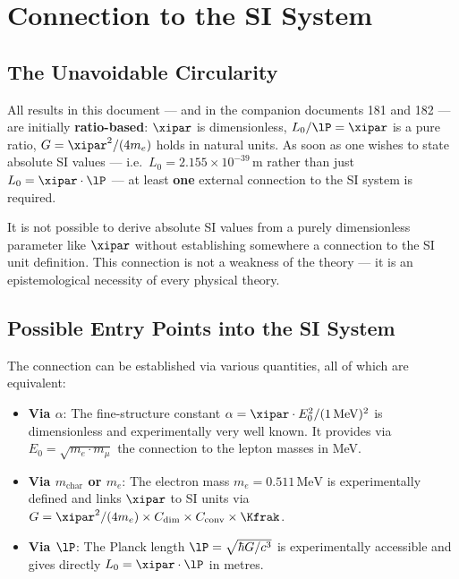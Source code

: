 \section{Connection to the SI System}

\subsection{The Unavoidable Circularity}

All results in this document — and in the companion documents 181 and 182 — are initially \textbf{ratio-based}: $\xipar$ is dimensionless, $L_0/\lP = \xipar$ is a pure ratio, $G = \xipar^2/(4m_e)$ holds in natural units. As soon as one wishes to state absolute SI values — i.e.\ $L_0 = 2{.}155 \times 10^{-39}\,\text{m}$ rather than just $L_0 = \xipar \cdot \lP$ — at least \textbf{one} external connection to the SI system is required.

\begin{important}
It is not possible to derive absolute SI values from a purely dimensionless parameter like $\xipar$ without establishing somewhere a connection to the SI unit definition. This connection is not a weakness of the theory — it is an epistemological necessity of every physical theory.
\end{important}

\subsection{Possible Entry Points into the SI System}

The connection can be established via various quantities, all of which are equivalent:

\begin{itemize}
	\item \textbf{Via $\alpha$}: The fine-structure constant $\alpha = \xipar \cdot E_0^2 / (1\,\text{MeV})^2$ is dimensionless and experimentally very well known. It provides via $E_0 = \sqrt{m_e \cdot m_\mu}$ the connection to the lepton masses in MeV.
	\item \textbf{Via $m_{\text{char}}$ or $m_e$}: The electron mass $m_e = 0{.}511\,\text{MeV}$ is experimentally defined and links $\xipar$ to SI units via $G = \xipar^2/(4m_e) \times C_{\text{dim}} \times C_{\text{conv}} \times \Kfrak$.
	\item \textbf{Via $\lP$}: The Planck length $\lP = \sqrt{\hbar G/c^3}$ is experimentally accessible and gives directly $L_0 = \xipar \cdot \lP$ in metres.
\end{itemize}

